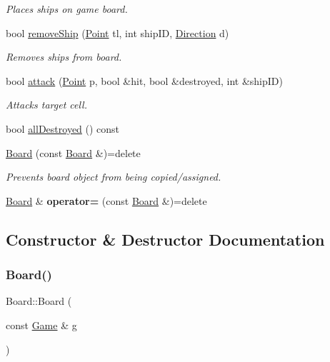 \begin{DoxyCompactItemize}
\begin{DoxyCompactList}\small\item\em Places ships on game board. \end{DoxyCompactList}\item 
bool \mbox{\hyperlink{class_board_a7d2f52e12bb4c861a1484ec0f54897d0}{remove\+Ship}} (\mbox{\hyperlink{class_point}{Point}} tl, int ship\+ID, \mbox{\hyperlink{_globals_8h_a224b9163917ac32fc95a60d8c1eec3aa}{Direction}} d)
\begin{DoxyCompactList}\small\item\em Removes ships from board. \end{DoxyCompactList}\item 
bool \mbox{\hyperlink{class_board_aad9932b230d16c6eef6fd9305399fbd2}{attack}} (\mbox{\hyperlink{class_point}{Point}} p, bool \&hit, bool \&destroyed, int \&ship\+ID)
\begin{DoxyCompactList}\small\item\em Attacks target cell. \end{DoxyCompactList}\item 
bool \mbox{\hyperlink{class_board_a4653d3028e70fea9f56523173a2e0a13}{all\+Destroyed}} () const
\item 
\mbox{\label{class_board_a1b25abe81ff08e6b574ecfc2dcaaa5be}} 
\mbox{\hyperlink{class_board_a1b25abe81ff08e6b574ecfc2dcaaa5be}{Board}} (const \mbox{\hyperlink{class_board}{Board}} \&)=delete
\begin{DoxyCompactList}\small\item\em Prevents board object from being copied/assigned. \end{DoxyCompactList}\item 
\mbox{\label{class_board_a892306c4b944bfe904b297092763084a}} 
\mbox{\hyperlink{class_board}{Board}} \& {\bfseries operator=} (const \mbox{\hyperlink{class_board}{Board}} \&)=delete
\end{DoxyCompactItemize}


\subsection{Constructor \& Destructor Documentation}
\mbox{\label{class_board_aa08d83943c9f7c727a96175feb05f1f8}} 
\subsubsection{\texorpdfstring{Board()}{Board()}}
{\footnotesize\ttfamily Board\+::\+Board (\begin{DoxyParamCaption}\item[{const \mbox{\hyperlink{class_game}{Game}} \&}]{g }\end{DoxyParamCaption})}



